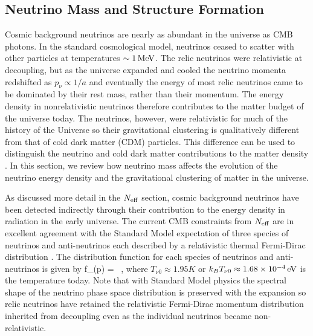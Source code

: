 \subsection{Neutrino Mass and Structure Formation}
\label{ssec:numasstheoryreview}
Cosmic background neutrinos are nearly as abundant in the universe as CMB photons. In the standard cosmological model, neutrinos ceased to scatter with other particles at temperatures $\sim 1 \, {\rm MeV}$. The relic neutrinos were relativistic at decoupling, but as the universe expanded and cooled the neutrino momenta redshifted as $p_\nu\propto 1/a$ and eventually the energy of most relic neutrinos came to be dominated by their rest mass, rather than their momentum. The energy density in nonrelativistic neutrinos therefore contributes to the matter budget of the universe today. The neutrinos, however, were relativistic for much of the history of the Universe so their gravitational clustering is qualitatively different from that of cold dark matter (CDM) particles. This difference can be used to distinguish the neutrino and cold dark matter contributions to the matter density \cite{Hu:1997mj, Lesgourgues:2006nd, Abazajian:2011dt}.  In this section, we review how neutrino mass affects the evolution of the neutrino energy density and the gravitational clustering of matter in the universe. 
 
As discussed more detail in the $N_{\rm eff}$ section, cosmic background neutrinos have been detected indirectly through their contribution to the energy density in radiation in the early universe. The current CMB constraints from $N_{\rm eff}$ are in excellent agreement with the Standard Model expectation of three species of neutrinos and anti-neutrinos each described by a relativistic thermal Fermi-Dirac distribution \cite{Ade:2015xua}. The distribution function for each species of neutrinos and anti-neutrinos is given by
\beq
f_\nu(p) =  \ ,
\eeq
where $T_{\nu 0} \approx 1.95K$ or $k_B T_{\nu 0} \approx 1.68 \times 10^{-4}\,{\rm eV}$ is the temperature today. Note that with Standard Model physics the spectral shape of the neutrino phase space distribution is preserved with the expansion so relic neutrinos have retained the relativistic Fermi-Dirac momentum distribution inherited from decoupling even as the individual neutrinos became non-relativistic. 

